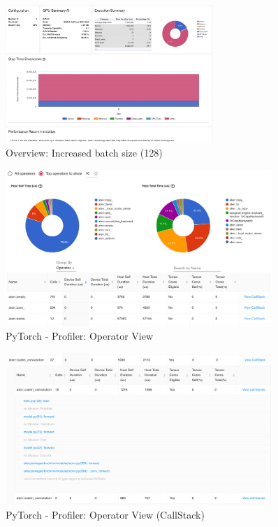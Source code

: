 \documentclass[12pt, a4paper, hidelinks]{article}
\begin{document}
\begin{figure}[H]
\centering
\includegraphics[width=0.7\textwidth]{./assets/scap_gtx1080_profiler-torch_batch-size-128_14650759}
\caption[]{Overview: Increased batch size (128)}
\label{fig:scap_gtx1080_profiler-torch_batch-size-128_14650759}
\end{figure}

\begin{figure}[H]
\centering
\includegraphics[width=0.9\textwidth]{./assets/scap_gtx1080_profiler-torch_batch-size-64_14650758_operator-view}
\caption[PyTorch - Profiler: Operator View]{PyTorch - Profiler: Operator View}
\label{fig:scap_gtx1080_profiler-torch_batch-size-64_14650758_operator-view}
\end{figure}

\begin{figure}[H]
\centering
\includegraphics[width=0.9\textwidth]{./assets/scap_gtx1080_profiler-torch_batch-size-64_14650758_operator-view-details}
\caption[PyTorch - Profiler: Operator View (CallStack)]{PyTorch - Profiler: Operator View (CallStack)}
\label{fig:scap_gtx1080_profiler-torch_batch-size-64_14650758_operator-view-details}
\end{figure}
\end{document}
